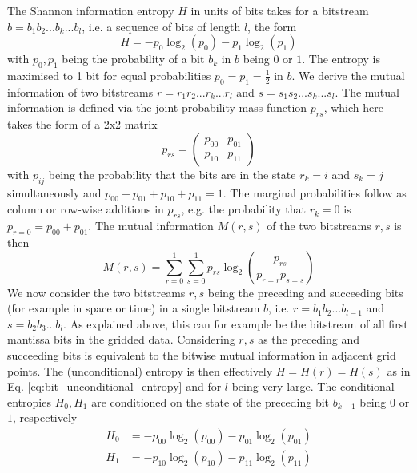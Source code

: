 The Shannon information entropy $H$ in units of bits \citep{Shannon1948} takes for a bitstream $b = b_1b_2...b_k...b_l$, i.e. a sequence
of bits of length $l$, the form
	\begin{equation}
	H = -p_0\log_2(p_0) - p_1\log_2(p_1)
	\label{eq:bit_unconditional_entropy}
	\end{equation}
with $p_0,p_1$ being the probability of a bit $b_k$ in $b$ being $0$ or $1$.
The entropy is maximised to 1 bit for equal probabilities $p_0 = p_1 = \tfrac{1}{2}$ in $b$. We derive the mutual information
\citep{Schreiber2000,Kraskov2004,Pothapakula2019}
of two bitstreams $r = r_1r_2...r_k...r_l$ and $s = s_1s_2...s_k...s_l$. The mutual information is defined via the joint probability
mass function $p_{rs}$, which here takes the form of a 2x2 matrix
 	\begin{equation}
	p_{rs} = \begin{pmatrix} p_{00} & p_{01} \\ p_{10} & p_{11} \end{pmatrix}
	\end{equation}
with $p_{ij}$ being the probability that the bits are in the state $r_k = i$ and $s_k = j$ simultaneously and $p_{00} + p_{01} + p_{10} + p_{11} = 1$.
The marginal probabilities follow as column or row-wise additions in $p_{rs}$, e.g. the probability that $r_k = 0$ is $p_{r=0} = p_{00} + p_{01}$.
The mutual information $M(r,s)$ of the two bitstreams $r,s$ is then
	\begin{equation}
	M(r,s) = \sum_{r=0}^1 \sum_{s=0}^1 p_{rs} \log_2 \left( \frac{p_{rs}}{p_{r=r}p_{s=s}} \right)
	\end{equation}
We now consider the two bitstreams $r,s$ being the preceding and succeeding bits (for example in space or time) in a single bitstream $b$,
i.e. $r=b_1b_2...b_{l-1}$ and $s=b_2b_3...b_l$. As explained above, this can for example be the bitstream of all first mantissa bits in the
gridded data. Considering $r,s$ as the preceding and succeeding bits is equivalent to the bitwise mutual information in adjacent grid points.
The (unconditional) entropy is then effectively $H = H(r) = H(s)$ as in Eq. \ref{eq:bit_unconditional_entropy} and for $l$ being very large.
The conditional entropies $H_0,H_1$ are conditioned on the state of the preceding bit $b_{k-1}$ being $0$ or $1$, respectively
	\begin{align}
	H_0 &= -p_{00} \log_2(p_{00}) - p_{01} \log_2(p_01)\\
	H_1 &= -p_{10} \log_2(p_{10}) - p_{11} \log_2(p_11) 
	\end{align}
